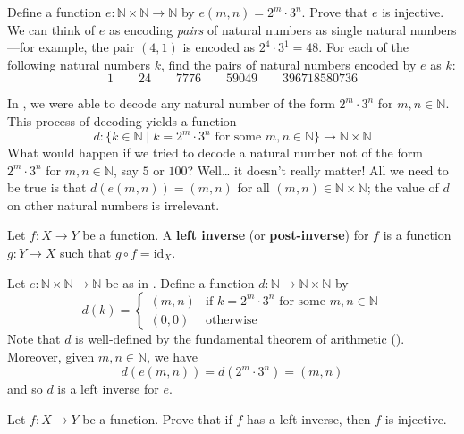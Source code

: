 \begin{exercise}
\label{exEncodingPairs}
Define a function $e : \mathbb{N} \times \mathbb{N} \to \mathbb{N}$ by $e(m,n) = 2^m \cdot 3^n$. Prove that $e$ is injective. We can think of $e$ as encoding \textit{pairs} of natural numbers as single natural numbers---for example, the pair $(4,1)$ is encoded as $2^4 \cdot 3^1 = 48$. For each of the following natural numbers $k$, find the pairs of natural numbers encoded by $e$ as $k$:
\[ 1 \qquad 24 \qquad 7776 \qquad 59049 \qquad 396718580736 \]
\end{exercise}

In , we were able to decode any natural number of the form $2^m \cdot 3^n$ for $m,n \in \mathbb{N}$. This process of decoding yields a function
\[ d : \{ k \in \mathbb{N} \mid k=2^m \cdot 3^n \text{ for some } m,n \in \mathbb{N} \} \to \mathbb{N} \times \mathbb{N} \]
What would happen if we tried to decode a natural number not of the form $2^m \cdot 3^n$ for $m,n \in \mathbb{N}$, say $5$ or $100$? Well\dots{} it doesn't really matter! All we need to be true is that $d(e(m,n))=(m,n)$ for all $(m,n) \in \mathbb{N} \times \mathbb{N}$; the value of $d$ on other natural numbers is irrelevant.

\begin{definition}
\label{defLeftInverse}
Let $f : X \to Y$ be a function. A \textbf{left inverse} (or \textbf{post-inverse}) for $f$ is a function $g : Y \to X$ such that $g \circ f = \mathrm{id}_X$.
\end{definition}

\begin{example}
Let $e : \mathbb{N} \times \mathbb{N} \to \mathbb{N}$ be as in . Define a function $d : \mathbb{N} \to \mathbb{N} \times \mathbb{N}$ by
\[ d(k) = \begin{cases}
(m,n) & \text{if } k=2^m \cdot 3^n \text{ for some } m,n \in \mathbb{N} \\
(0,0) & \text{otherwise}
\end{cases} \]
Note that $d$ is well-defined by the fundamental theorem of arithmetic (). Moreover, given $m,n \in \mathbb{N}$, we have
\[ d(e(m,n)) = d(2^m \cdot 3^n) = (m,n) \]
and so $d$ is a left inverse for $e$.
\end{example}

\begin{exercise}
\label{exIfHasLeftInverseThenInjective}
Let $f : X \to Y$ be a function. Prove that if $f$ has a left inverse, then $f$ is injective.
\end{exercise}

